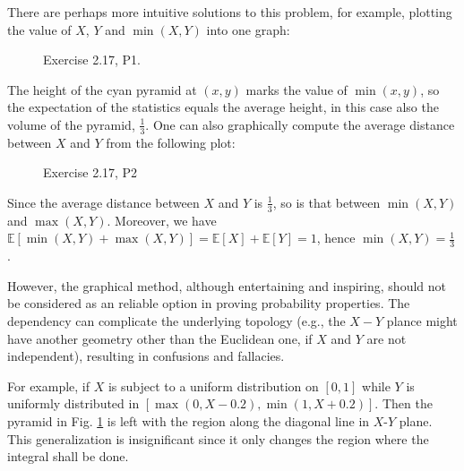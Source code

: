 \documentclass[UTF8]{ctexart}
\begin{document}
There are perhaps more intuitive solutions to this problem, for example, plotting the value of $X$, $Y$ and $\min(X,Y)$ into one graph:
\begin{figure}[htbp]
\centering
{}
\caption{Exercise 2.17, P1.}
\label{figure:2.1}
\end{figure}
The height of the cyan pyramid at $(x,y)$ marks the value of $\min(x,y)$, so the expectation of the statistics equals the average height, in this case also the volume of the pyramid, $\frac{1}{3}$.
One can also graphically compute the average distance between $X$ and $Y$ from the following plot:
\begin{figure}[htbp]
\centering
{}
\caption{Exercise 2.17, P2}
\end{figure}
Since the average distance between $X$ and $Y$ is $\frac{1}{3}$, so is that between $\min(X,Y)$ and $\max(X,Y)$.
Moreover, we have $\mathbb{E}[\min(X,Y)+\max(X,Y)]=\mathbb{E}[X]+\mathbb{E}[Y]=1$, hence $\min(X,Y)=\frac{1}{3}$.

However, the graphical method, although entertaining and inspiring, should not be considered as an reliable option in proving probability properties.
The dependency can complicate the underlying topology (e.g., the $X-Y$ plance might have another geometry other than the Euclidean one, if $X$ and $Y$ are not independent), resulting in confusions and fallacies.

For example, if $X$ is subject to a uniform distribution on $[0,1]$ while $Y$ is uniformly distributed in $[\max(0,X-0.2),\min(1,X+0.2)]$.
Then the pyramid in Fig. \ref{figure:2.1} is left with the region along the diagonal line in $X$-$Y$ plane.
This generalization is insignificant since it only changes the region where the integral shall be done.
\end{document}
